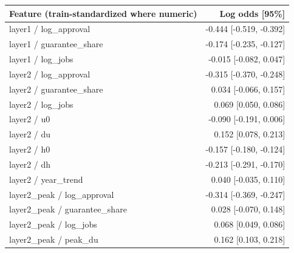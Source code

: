 \begingroup\small\setlength{\tabcolsep}{3pt}
\begin{tabularx}{\linewidth}{Xr}\toprule
Feature (train-standardized where numeric) & Log odds [95\%] \\ \midrule
layer1 / log\_approval & -0.444 [-0.519, -0.392] \\
layer1 / guarantee\_share & -0.174 [-0.235, -0.127] \\
layer1 / log\_jobs & -0.015 [-0.082, 0.047] \\
layer2 / log\_approval & -0.315 [-0.370, -0.248] \\
layer2 / guarantee\_share & 0.034 [-0.066, 0.157] \\
layer2 / log\_jobs & 0.069 [0.050, 0.086] \\
layer2 / u0 & -0.090 [-0.191, 0.006] \\
layer2 / du & 0.152 [0.078, 0.213] \\
layer2 / h0 & -0.157 [-0.180, -0.124] \\
layer2 / dh & -0.213 [-0.291, -0.170] \\
layer2 / year\_trend & 0.040 [-0.035, 0.110] \\
layer2\_peak / log\_approval & -0.314 [-0.369, -0.247] \\
layer2\_peak / guarantee\_share & 0.028 [-0.070, 0.148] \\
layer2\_peak / log\_jobs & 0.068 [0.049, 0.086] \\
layer2\_peak / peak\_du & 0.162 [0.103, 0.218] \\
\bottomrule\end{tabularx}\endgroup
